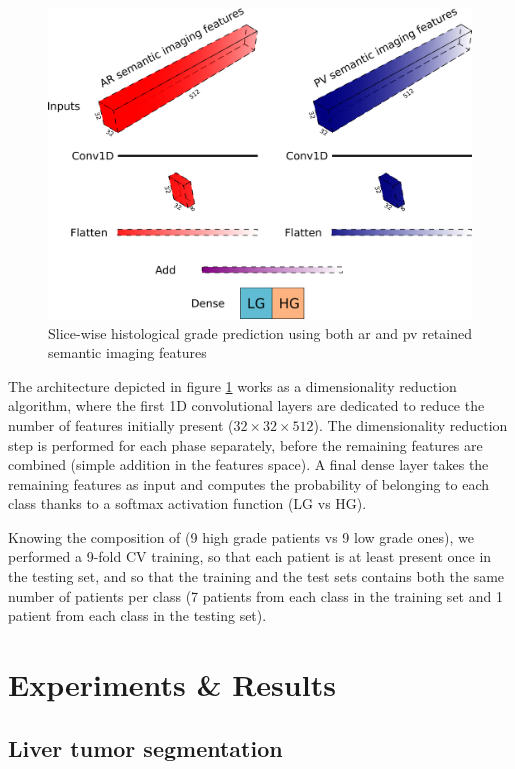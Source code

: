 \begin{figure}[!ht]
	\centering
	\includegraphics[width=0.9\linewidth]{../HistologicalGradePrediction/images/gradpredictionArchitecture}
	\caption{Slice-wise histological grade prediction using both \ac{ar} and \ac{pv} retained semantic imaging features}
	\label{fig:gradpredictionArchitecture}
\end{figure}

The architecture depicted in figure \ref{fig:gradpredictionArchitecture} works as a dimensionality
reduction algorithm, where the first 1D convolutional layers are dedicated to
reduce the number of features initially present ($ 32\times32\times512 $). The
dimensionality reduction step is performed for each phase separately,
before the remaining features are combined (simple addition in the
features space).
A final dense layer takes the remaining features as input and computes
the probability of belonging to each class thanks to a softmax activation
function (LG vs HG).

Knowing the composition of \textbf{} (9 high grade patients vs 9 low
grade ones), we performed a 9-fold CV training, so that each patient is
at least present once in the testing set, and so that the training and
the test sets contains both the same number of patients per
class (7 patients from each class in the training set and 1 patient from
each class in the testing set).

\section{Experiments \& Results}


\subsection{Liver tumor segmentation}

